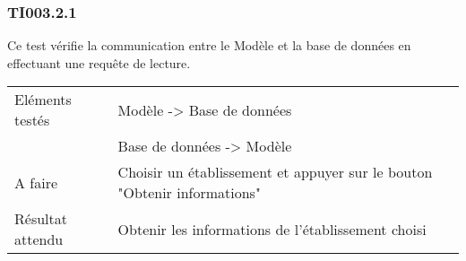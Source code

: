 \subsubsection{TI003.2.1}
  		Ce test vérifie la communication entre le Modèle et la base de données en effectuant une requête de lecture.
  		\begin{center}
    	 		\begin{tabular}[h]{|p{}|p{}|}
			\hline
				Eléments testés & Modèle -> Base de données  \\
							    &  Base de données -> Modèle \\\hline
    				A faire & Choisir un établissement et appuyer sur le bouton "Obtenir informations" \\\hline
    				Résultat attendu & Obtenir les informations de l'établissement choisi \\\hline
     		\end{tabular}
  		\end{center}	